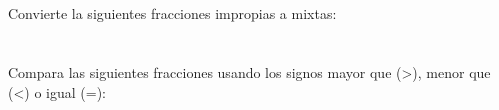 \documentclass[12pt,addpoints,answers]{evalua}
\begin{document}
\begin{questions}
    \subsection*{\else{}\fi}

    \question[4] Convierte la siguientes fracciones impropias a mixtas:
    \begin{multicols}{3}
    \end{multicols}

    \newpage
    \section*{\else{}\fi}

    \subsection*{\else{}\fi}

    \question[8] Compara las siguientes fracciones usando los signos mayor que (>), menor que (<) o igual (=):
    \begin{multicols}{3}
\end{multicols}
\end{questions}
\end{document}
